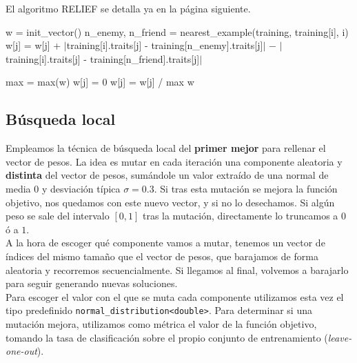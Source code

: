 \documentclass[12pt]{article}
\begin{document}
El algoritmo RELIEF se detalla ya en la página siguiente.
\newpage

\begin{algorithm}[h!]
\begin{algorithmic}

     \State w = init\_vector()
       
         \State n\_enemy, n\_friend = nearest\_example(training, training[i], i)
           
            \State w[j] = w[j] + $|$training[i].traits[j] - training[n\_enemy].traits[j]$|$
            \State \hspace{2.5em} $-$ $|$training[i].traits[j] - training[n\_friend].traits[j]$|$

         \EndFor
      \EndFor
      \State max = max(w)
        
            \State w[j] = 0
        \Else
            \State w[j] = w[j] / max
        \EndIf
      \EndFor
\State \Return w
\EndFunction

\end{algorithmic}
\end{algorithm}


\subsection*{{\color{red} Búsqueda local}}

Empleamos la técnica de búsqueda local del \textbf{primer mejor} para rellenar el vector de pesos. La idea es mutar en cada iteración una componente aleatoria y \textbf{distinta} del vector de pesos, sumándole un valor extraído de una normal de media $0$ y desviación típica $\sigma = 0.3$. Si tras esta mutación se mejora la función objetivo, nos quedamos con este nuevo vector, y si no lo desechamos. Si algún peso se sale del intervalo $[0,1]$ tras la mutación, directamente lo truncamos a $0$ ó a $1$.\\

A la hora de escoger qué componente vamos a mutar, tenemos un vector de índices del mismo tamaño que el vector de pesos, que barajamos de forma aleatoria y recorremos secuencialmente. Si llegamos al final, volvemos a barajarlo para seguir generando nuevas soluciones. \\

Para escoger el valor con el que se muta cada componente utilizamos esta vez el tipo predefinido \verb|normal_distribution<double>|. Para determinar si una mutación mejora, utilizamos como métrica el valor de la función objetivo, tomando la tasa de clasificación sobre el propio conjunto de entrenamiento (\textit{leave-one-out}). \\
\end{document}
